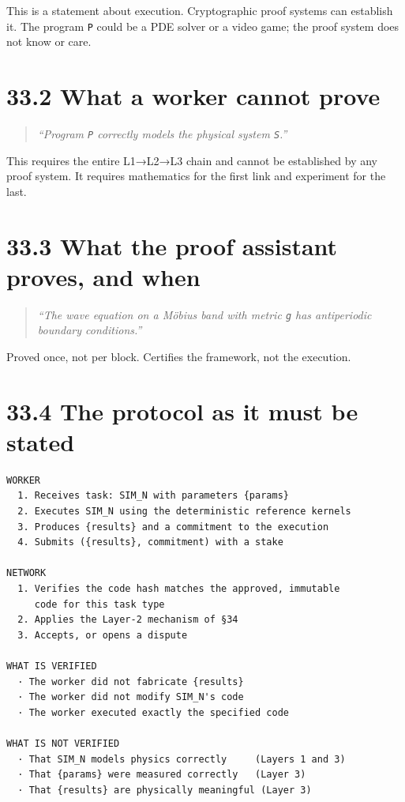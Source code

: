 \documentclass[
  11pt]{report}
\begin{document}
This is a statement about execution. Cryptographic proof systems can
establish it. The program \texttt{P} could be a PDE solver or a video
game; the proof system does not know or care.

\hypertarget{what-a-worker-cannot-prove}{%
\section{33.2 What a worker cannot
prove}\label{what-a-worker-cannot-prove}}

\begin{quote}
\emph{``Program \texttt{P} correctly models the physical system
\texttt{S}.''}
\end{quote}

This requires the entire L1→L2→L3 chain and cannot be established by any
proof system. It requires mathematics for the first link and experiment
for the last.

\hypertarget{what-the-proof-assistant-proves-and-when}{%
\section{33.3 What the proof assistant proves, and
when}\label{what-the-proof-assistant-proves-and-when}}

\begin{quote}
\emph{``The wave equation on a Möbius band with metric \texttt{g} has
antiperiodic boundary conditions.''}
\end{quote}

Proved once, not per block. Certifies the framework, not the execution.

\hypertarget{the-protocol-as-it-must-be-stated}{%
\section{33.4 The protocol as it must be
stated}\label{the-protocol-as-it-must-be-stated}}

\begin{verbatim}
WORKER
  1. Receives task: SIM_N with parameters {params}
  2. Executes SIM_N using the deterministic reference kernels
  3. Produces {results} and a commitment to the execution
  4. Submits ({results}, commitment) with a stake

NETWORK
  1. Verifies the code hash matches the approved, immutable
     code for this task type
  2. Applies the Layer-2 mechanism of §34
  3. Accepts, or opens a dispute

WHAT IS VERIFIED
  · The worker did not fabricate {results}
  · The worker did not modify SIM_N's code
  · The worker executed exactly the specified code

WHAT IS NOT VERIFIED
  · That SIM_N models physics correctly     (Layers 1 and 3)
  · That {params} were measured correctly   (Layer 3)
  · That {results} are physically meaningful (Layer 3)
\end{verbatim}
\end{document}
